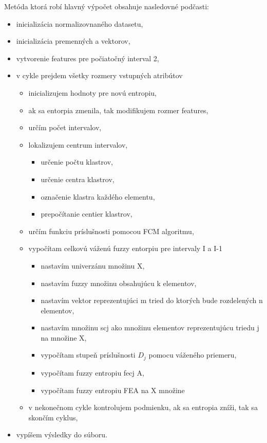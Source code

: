 Metóda ktorá robí hlavný výpočet obsahuje nasledovné podčasti: 
\begin{itemize}
\item inicializácia normalizovnaného datasetu, 
\item inicializácia premenných a vektorov, 
\item vytvorenie features pre počiatočný interval 2, 
\item v cykle prejdem všetky rozmery vstupných atribútov
\begin{itemize}
\item inicializujem hodnoty pre novú entropiu, 
\item ak sa entorpia zmenila, tak modifikujem rozmer features, 
\item určím počet intervalov, 
\item lokalizujem centrum intervalov, 
\begin{itemize}
\item určenie počtu klastrov, 
\item určenie centra klastrov, 
\item označenie klastra každého elementu, 
\item prepočítanie centier klastrov, 
\end{itemize}
\item určím funkciu príslušnosti pomocou FCM algoritmu, 
\item vypočítam celkovú váženú fuzzy entorpiu pre intervaly I a I-1
\begin{itemize}
\item nastavím univerzánu množinu X,
\item nastavím fuzzy množinu obsahujúcu k elementov,
\item nastavím vektor reprezentujúci m tried do ktorých bude rozdelených n elementov, 
\item nastavím množinu scj ako množinu elementov reprezentujúcu triedu j na množine X, 
\item vypočítam stupeň príslušnosti $D_j$ pomocu váženého priemeru, 
\item vypočítam fuzzy entropiu fecj A,
\item vypočítam fuzzy entropiu FEA na X množine
\end{itemize}

\item v nekonečnom cykle kontrolujem podmienku, ak sa entropia zníži, tak sa skončím cyklus, 
\end{itemize}
\item vypíšem výsledky do súboru. 
\end{itemize}

